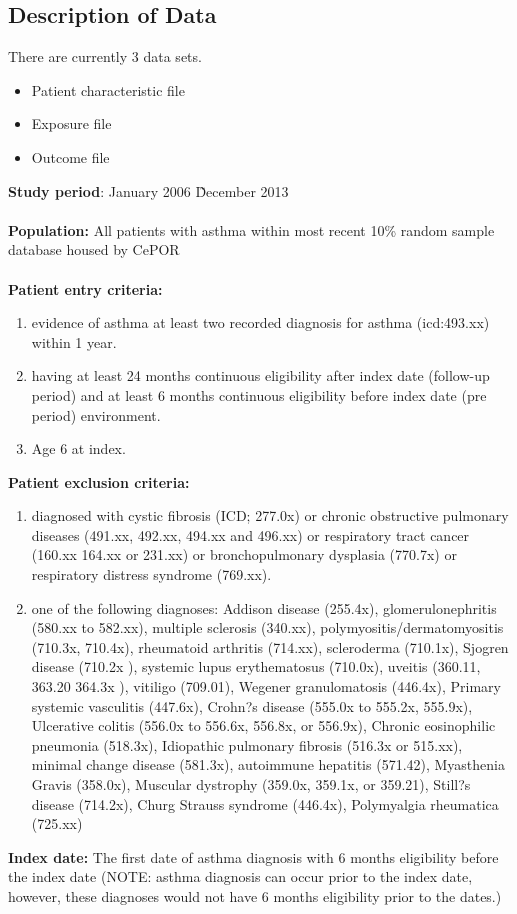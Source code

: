 \documentclass[10pt,a4paper,fleqn]{article}
\begin{document}
\subsection{Description of Data}
There are currently 3 data sets.
\begin{itemize}
  \item Patient characteristic file
  \item Exposure file
  \item Outcome file
\end{itemize}
\textbf{Study period}: January 2006 \~ December 2013\\~\\
\textbf{Population:} All patients with asthma within most recent 10\% random sample database housed by CePOR\\~\\
\textbf{Patient entry criteria:}
\begin{enumerate}
  \item evidence of asthma at least two recorded diagnosis for asthma (icd:493.xx) within 1 year.
  \item having at least 24 months continuous eligibility after index date (follow-up period) and at least 6 months continuous eligibility before index date (pre\- period) environment.
  \item Age 6 at index.
\end{enumerate}
\textbf{Patient exclusion criteria:}
\begin{enumerate}
  \item diagnosed with cystic fibrosis  (ICD; 277.0x) or chronic obstructive pulmonary diseases (491.xx, 492.xx, 494.xx and 496.xx) or respiratory tract cancer (160.xx \- 164.xx or 231.xx) or bronchopulmonary dysplasia (770.7x) or respiratory distress syndrome (769.xx).
  \item one of the following diagnoses: Addison disease (255.4x), glomerulonephritis (580.xx to 582.xx), multiple sclerosis (340.xx), polymyositis/dermatomyositis (710.3x, 710.4x), rheumatoid arthritis (714.xx), scleroderma (710.1x), Sjogren disease (710.2x ), systemic lupus erythematosus (710.0x), uveitis (360.11, 363.20 364.3x ), vitiligo (709.01), Wegener granulomatosis (446.4x), Primary systemic vasculitis (447.6x), Crohn?s disease (555.0x to 555.2x, 555.9x), Ulcerative colitis (556.0x to 556.6x, 556.8x, or 556.9x), Chronic eosinophilic pneumonia (518.3x), Idiopathic pulmonary fibrosis (516.3x or 515.xx), minimal change disease (581.3x), autoimmune hepatitis (571.42), Myasthenia Gravis (358.0x), Muscular dystrophy (359.0x, 359.1x, or 359.21), Still?s disease (714.2x), Churg Strauss syndrome (446.4x), Polymyalgia rheumatica (725.xx)
\end{enumerate}
\textbf{Index date:} The first date of asthma diagnosis with 6 months eligibility before the index date (NOTE: asthma diagnosis can occur prior to the index date, however, these diagnoses would not have 6 months eligibility prior to the dates.) \\~\\
\end{document}
